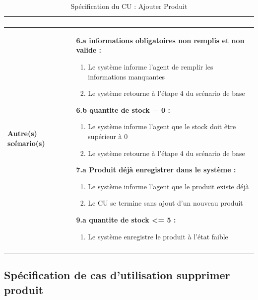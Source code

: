 \begin{longtable}{|p{3.4cm}|p{11.2cm}|}
\begin{enumerate}[leftmargin=1.5em, topsep=2pt, itemsep=1pt]
\end{enumerate} \\
\hline
\textbf{Autre(s) scénario(s)} &
\textbf{6.a informations obligatoires non remplis et non valide :}
\begin{enumerate}[leftmargin=1.5em, topsep=2pt, itemsep=1pt]
  \item Le système informe l'agent de remplir les informations manquantes
  \item Le système retourne à l'étape 4 du scénario de base
\end{enumerate}
\textbf{6.b quantite de stock = 0 :}
\begin{enumerate}[leftmargin=1.5em, topsep=2pt, itemsep=1pt]
  \item Le système informe l'agent que le stock doit être supérieur à 0
  \item Le système retourne à l'étape 4 du scénario de base
\end{enumerate}
\textbf{7.a Produit déjà enregistrer dans le système :}
\begin{enumerate}[leftmargin=1.5em, topsep=2pt, itemsep=1pt]
  \item Le système informe l'agent que le produit existe déjà
  \item Le CU se termine sans ajout d'un nouveau produit
\end{enumerate}
\textbf{9.a quantite de stock <= 5 :}
\begin{enumerate}[leftmargin=1.5em, topsep=2pt, itemsep=1pt]
  \item Le système enregistre le produit à l'état faible
\end{enumerate} \\
\hline
\caption{Spécification du CU : Ajouter Produit}
\label{tab:cu-ajouter-produit}
\end{longtable}
\endgroup

\newpage
\subsection{Spécification de cas d'utilisation supprimer produit}


